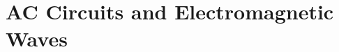 \documentclass[../book.tex]{subfiles}
\begin{document}
\chapter{AC Circuits and Electromagnetic Waves}
\label{ch:ac-and-em-waves}
















\chapterbib
\end{document}
